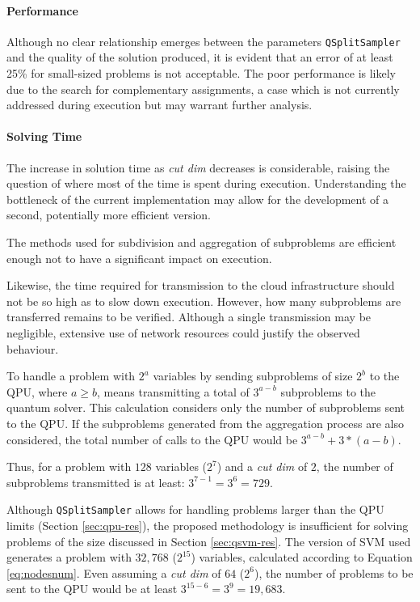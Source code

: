 \paragraph{Performance} Although no clear relationship emerges between the parameters \texttt{QSplitSampler} and the quality of the solution produced, it is evident that an error of at least 25\% for small-sized problems is not acceptable. 
The poor performance is likely due to the search for complementary assignments, a case which is not currently addressed during execution but may warrant further analysis.

\paragraph{Solving Time} The increase in solution time as \emph{cut dim} decreases is considerable, raising the question of where most of the time is spent during execution. 
Understanding the bottleneck of the current implementation may allow for the development of a second, potentially more efficient version.

The methods used for subdivision and aggregation of subproblems are efficient enough not to have a significant impact on execution.

Likewise, the time required for transmission to the cloud infrastructure should not be so high as to slow down execution. 
However, how many subproblems are transferred remains to be verified. 
Although a single transmission may be negligible, extensive use of network resources could justify the observed behaviour.

To handle a problem with $2^a$ variables by sending subproblems of size $2^b$ to the QPU, where $a \geq b$, means transmitting a total of $3^{a-b}$ subproblems to the quantum solver. 
This calculation considers only the number of subproblems sent to the QPU. 
If the subproblems generated from the aggregation process are also considered, the total number of calls to the QPU would be $3^{a-b} + 3*(a-b)$.

Thus, for a problem with $128$ variables ($2^7$) and a \emph{cut dim} of $2$, the number of subproblems transmitted is at least: $3^{7-1}=3^6=729$.

Although \texttt{QSplitSampler} allows for handling problems larger than the QPU limits (Section \ref{sec:qpu-res}), the proposed methodology is insufficient for solving problems of the size discussed in Section \ref{sec:qsvm-res}. 
The version of SVM used generates a problem with $32,768$ ($2^{15}$) variables, calculated according to Equation \eqref{eq:nodesnum}. 
Even assuming a \emph{cut dim} of $64$ ($2^6$), the number of problems to be sent to the QPU would be at least $3^{15-6}=3^9=19,683$.
